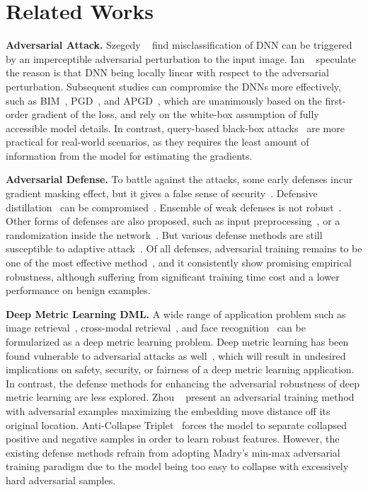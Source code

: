 \documentclass[10pt,twocolumn,letterpaper]{article}
\begin{document}
\section{Related Works}
\label{sec:2}

\textbf{Adversarial Attack.}
%
Szegedy \etal~\cite{l-bfgs} find misclassification of DNN can be triggered by
an imperceptible adversarial perturbation to the input image.
%
Ian \etal~\cite{fgsm} speculate the reason is that DNN being locally linear
with respect to the adversarial perturbation.
%
Subsequent studies can compromise the DNNs more effectively, such as
BIM~\cite{i-fgsm}, PGD~\cite{madry}, and APGD~\cite{apgd}, which are
unanimously based on the first-order gradient of the loss, and rely on the
white-box assumption of fully accessible model details.
%
In contrast, query-based black-box attacks~\cite{nes-atk,spsa-atk} are more
practical for real-world scenarios, as they requires the least amount of
information from the model for estimating the gradients.

\textbf{Adversarial Defense.}
%
To battle against the attacks, some early defenses incur gradient masking
effect, but it gives a false sense of security~\cite{obfuscated}.
%
Defensive distillation~\cite{distill2} can be compromised~\cite{cw}.
%
Ensemble of weak defenses is not robust~\cite{ensembleweak}.
%
Other forms of defenses are also proposed, such as input
preprocessing~\cite{deflecting}, or a randomization inside the
network~\cite{self-ensemble}.
%
But various defense methods are still susceptible to adaptive
attack~\cite{adaptive}.
%
Of all defenses, adversarial training remains to be one of the most
effective method~\cite{bilateral,advtrain-triplet,benchmarking}, and it
consistently show promising empirical robustness,
although suffering from significant training time cost and a lower performance
on benign examples.

\textbf{Deep Metric Learning DML.}
%
A wide range of application problem such as image retrieval~\cite{imagesim2},
cross-modal retrieval~\cite{ladderloss}, and face recognition~\cite{facenet}
can be formularized as a deep metric learning problem.
%
Deep metric learning has been found vulnerable to adversarial attacks as
well~\cite{advrank,advorder}, which will result in undesired implications on
safety, security, or fairness of a deep metric learning application.
%
In contrast, the defense methods for enhancing the adversarial robustness of
deep metric learning are less explored.
%
Zhou \etal~\cite{advrank} present an adversarial training method with
adversarial examples maximizing the embedding move distance off its original
location.
%
Anti-Collapse Triplet~\cite{robrank} forces the model to separate collapsed
positive and negative samples in order to learn robust features.
%
However, the existing defense methods refrain from adopting Madry's min-max
adversarial training paradigm due to the model being too easy to collapse with
excessively hard adversarial samples.
\end{document}
